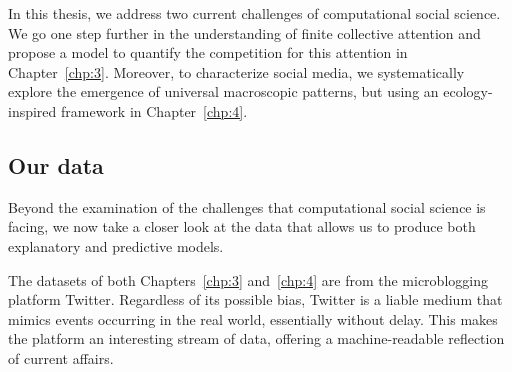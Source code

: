 In this thesis, we address two current challenges of computational social science. We go one step further in the understanding of finite collective attention and propose a model to quantify the competition for this attention in Chapter~\ref{chp:3}. Moreover, to characterize social media, we systematically explore the emergence of universal macroscopic patterns, but using an ecology-inspired framework in Chapter~\ref{chp:4}.

\subsection{Our data}
Beyond the examination of the challenges that computational social science is facing, we now take a closer look at the data that allows us to produce both explanatory and predictive models.  

The datasets of both Chapters~\ref{chp:3} and~\ref{chp:4} are from the microblogging platform Twitter. Regardless of its possible bias, Twitter is a liable medium that mimics events occurring in the real world, essentially without delay. This makes the platform an interesting stream of data, offering a machine-readable reflection of current affairs. \\

